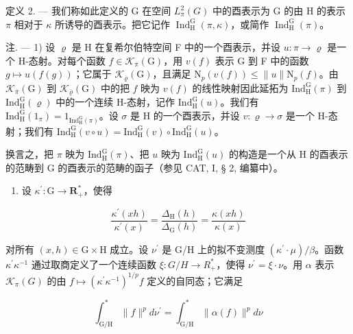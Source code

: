 定义 2. --- 我们称如此定义的 G 在空间 \(L_{\overline{\pi}}^{2}(G)\) 中的酉表示为 G 的由 H 的表示 \(\pi\) 相对于 \(\kappa\) 所诱导的酉表示。把它记作 \(\operatorname{Ind}_{\mathrm{H}}^{\mathrm{G}}(\pi, \kappa)\)，或简作 \(\operatorname{Ind}_{\mathrm{H}}^{\mathrm{G}}(\pi)\)。

 注. --- 1) 设 \(\varrho\) 是 H 在复希尔伯特空间 F 中的一个酉表示，并设 \(u\colon\pi\to\varrho\) 是一个 H-态射。对每个函数 \(f\in\mathcal{K}_{\overline{\pi}}(\mathrm{G})\)，用 \(v(f)\) 表示 G 到 F 中的函数 \(g\mapsto u(f(g))\)；它属于 \(\mathcal{K}_{\overline{\varrho}}(\mathrm{G})\)，且满足 \(\mathrm{N}_{p}(v(f))\leqslant\|u\|\mathrm{N}_{p}(f)\)。由 \(\mathcal{K}_{\overline{\pi}}(\mathrm{G})\) 到 \(\mathcal{K}_{\overline{\varrho}}(\mathrm{G})\) 中的把 \(f\) 映为 \(v(f)\) 的线性映射因此延拓为 \(\mathrm{Ind}_{\mathrm{H}}^{\mathrm{G}}(\pi)\) 到 \(\mathrm{Ind}_{\mathrm{H}}^{\mathrm{G}}(\varrho)\) 中的一个连续 H-态射，记作 \(\mathrm{Ind}_{\mathrm{H}}^{\mathrm{G}}(u)\)。我们有 \(\mathrm{Ind}_{\mathrm{H}}^{\mathrm{G}}(1_{\pi})=1_{\mathrm{Ind}_{\mathrm{H}}^{\mathrm{G}}(\pi)}\)。设 \(\sigma\) 是 H 的一个酉表示，并设 \(v\colon\varrho\to\sigma\) 是一个 H-态射；我们有 \(\mathrm{Ind}_{\mathrm{H}}^{\mathrm{G}}(v\circ u)=\mathrm{Ind}_{\mathrm{H}}^{\mathrm{G}}(v)\circ\mathrm{Ind}_{\mathrm{H}}^{\mathrm{G}}(u)\)。

换言之，把 \(\pi\) 映为 \(\mathrm{Ind}_{\mathrm{H}}^{\mathrm{G}}(\pi)\)、把 \(u\) 映为 \(\mathrm{Ind}_{\mathrm{H}}^{\mathrm{G}}(u)\) 的构造是一个从 H 的酉表示的范畴到 G 的酉表示的范畴的函子（参见 CAT, I, § 2, 编纂中）。

\begin{enumerate}
\def\labelenumi{\arabic{enumi})}
\setcounter{enumi}{1}
\tightlist
\item
  设 \(\kappa^{\prime}\colon \mathrm{G}\to \mathbf{R}_{+}^{*}\)，使得
\end{enumerate}

\[
\frac {\kappa^ {\prime} (x h)}{\kappa^ {\prime} (x)} = \frac {\Delta_ {\mathrm{H}} (h)}{\Delta_ {\mathrm{G}} (h)} = \frac {\kappa (x h)}{\kappa (x)}
\]

 对所有 \((x,h)\in\mathrm{G}\times\mathrm{H}\) 成立。设 \(\nu^{\prime}\) 是 G/H 上的拟不变测度 \((\kappa^{\prime}\cdot\mu)/\beta\)。函数 \(\kappa^{\prime}\kappa^{-1}\) 通过取商定义了一个连续函数 \(\xi\colon G/H\to R_{+}^{*}\)，使得 \(\nu^{\prime}=\xi\cdot\nu\)。用 \(\alpha\) 表示 \(\mathcal{K}_{\pi}(G)\) 的由 \(f\mapsto(\kappa^{\prime}\kappa^{-1})^{1/p}f\) 定义的自同态；它满足

\[
\int_ {\mathrm{G} / \mathrm{H}} ^ {*} \| f \| ^ {p} d \nu^ {\prime} = \int_ {\mathrm{G} / \mathrm{H}} ^ {*} \| \alpha (f) \| ^ {p} d \nu
\]

